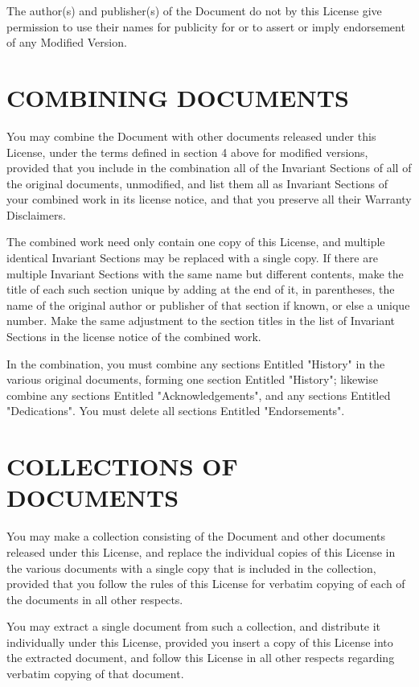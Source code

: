 \documentclass{stacks-project-book}
\theoremstyle{plain}
\theoremstyle{definition}
\theoremstyle{remark}
\numberwithin{equation}{subsection}
\begin{document}
The author(s) and publisher(s) of the Document do not by this License
give permission to use their names for publicity for or to assert or
imply endorsement of any Modified Version.


\section{COMBINING DOCUMENTS}
\label{fdl-section-combining-documents}


You may combine the Document with other documents released under this
License, under the terms defined in section 4 above for modified
versions, provided that you include in the combination all of the
Invariant Sections of all of the original documents, unmodified, and
list them all as Invariant Sections of your combined work in its
license notice, and that you preserve all their Warranty Disclaimers.

The combined work need only contain one copy of this License, and
multiple identical Invariant Sections may be replaced with a single
copy.  If there are multiple Invariant Sections with the same name but
different contents, make the title of each such section unique by
adding at the end of it, in parentheses, the name of the original
author or publisher of that section if known, or else a unique number.
Make the same adjustment to the section titles in the list of
Invariant Sections in the license notice of the combined work.

In the combination, you must combine any sections Entitled "History"
in the various original documents, forming one section Entitled
"History"; likewise combine any sections Entitled "Acknowledgements",
and any sections Entitled "Dedications".  You must delete all sections
Entitled "Endorsements".

\section{COLLECTIONS OF DOCUMENTS}
\label{fdl-section-collections-of-documents}

You may make a collection consisting of the Document and other documents
released under this License, and replace the individual copies of this
License in the various documents with a single copy that is included in
the collection, provided that you follow the rules of this License for
verbatim copying of each of the documents in all other respects.

You may extract a single document from such a collection, and distribute
it individually under this License, provided you insert a copy of this
License into the extracted document, and follow this License in all
other respects regarding verbatim copying of that document.
\end{document}
